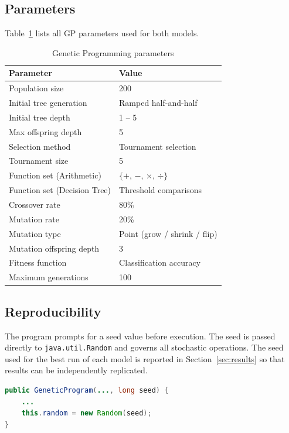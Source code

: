 \documentclass[12pt,a4paper]{article}
\begin{document}
\subsection{Parameters}

Table~\ref{tab:params} lists all GP parameters used for both models.

\begin{table}[H]
\centering
\caption{Genetic Programming parameters}
\label{tab:params}
\begin{tabular}{ll}
\toprule
\textbf{Parameter}          & \textbf{Value} \\
\midrule
Population size             & 200 \\
Initial tree generation     & Ramped half-and-half \\
Initial tree depth          & 1 -- 5 \\
Max offspring depth         & 5 \\
Selection method            & Tournament selection \\
Tournament size             & 5 \\
Function set (Arithmetic)   & $\{+,\,-,\,\times,\,\div\}$ \\
Function set (Decision Tree) & Threshold comparisons \\
Crossover rate              & 80\% \\
Mutation rate               & 20\% \\
Mutation type               & Point (grow / shrink / flip) \\
Mutation offspring depth    & 3 \\
Fitness function            & Classification accuracy \\
Maximum generations         & 100 \\
\bottomrule
\end{tabular}
\end{table}

\subsection{Reproducibility}

The program prompts for a seed value before execution. The seed is passed directly to \texttt{java.util.Random} and governs all stochastic operations. The seed used for the best run of each model is reported in Section~\ref{sec:results} so that results can be independently replicated.

\begin{lstlisting}[language=Java, caption={Seeded random initialisation (GeneticProgram.java)}]
public GeneticProgram(..., long seed) {
    ...
    this.random = new Random(seed);
}
\end{lstlisting}
\end{document}
